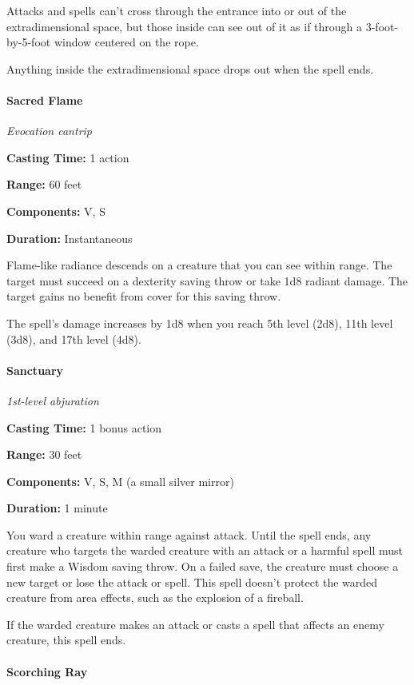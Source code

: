 \documentclass[
]{article}
\begin{document}
Attacks and spells can't cross through the entrance into or out of the
extradimensional space, but those inside can see out of it as if through
a 3-foot-by-5-foot window centered on the rope.

Anything inside the extradimensional space drops out when the spell
ends.

\hypertarget{sacred-flame}{%
\paragraph{Sacred Flame}\label{sacred-flame}}

\emph{Evocation cantrip}

\textbf{Casting Time:} 1 action

\textbf{Range:} 60 feet

\textbf{Components:} V, S

\textbf{Duration:} Instantaneous

Flame-like radiance descends on a creature that you can see within
range. The target must succeed on a dexterity saving throw or take 1d8
radiant damage. The target gains no benefit from cover for this saving
throw.

The spell's damage increases by 1d8 when you reach 5th level (2d8), 11th
level (3d8), and 17th level (4d8).

\hypertarget{sanctuary}{%
\paragraph{Sanctuary}\label{sanctuary}}

\emph{1st-level abjuration}

\textbf{Casting Time:} 1 bonus action

\textbf{Range:} 30 feet

\textbf{Components:} V, S, M (a small silver mirror)

\textbf{Duration:} 1 minute

You ward a creature within range against attack. Until the spell ends,
any creature who targets the warded creature with an attack or a harmful
spell must first make a Wisdom saving throw. On a failed save, the
creature must choose a new target or lose the attack or spell. This
spell doesn't protect the warded creature from area effects, such as the
explosion of a fireball.

If the warded creature makes an attack or casts a spell that affects an
enemy creature, this spell ends.

\hypertarget{scorching-ray}{%
\paragraph{Scorching Ray}\label{scorching-ray}}
\end{document}
